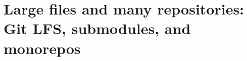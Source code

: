 \chapter{Large files and many repositories: Git LFS, submodules, and monorepos}
\label{ch:large-files-and-many-repositories-git}

